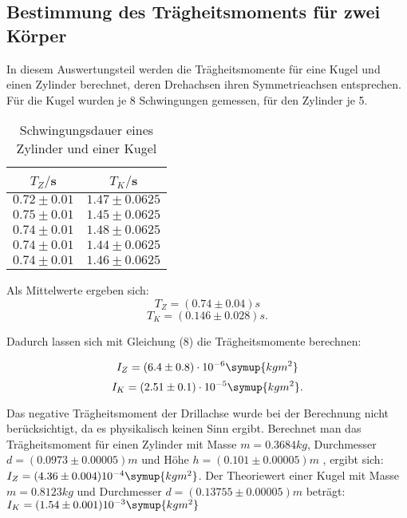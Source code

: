 \subsection{Bestimmung des Trägheitsmoments für zwei Körper}
In diesem Auswertungsteil werden die Trägheitsmomente für eine Kugel und einen 
Zylinder berechnet, deren Drehachsen ihren Symmetrieachsen entsprechen.
Für die Kugel wurden je 8 Schwingungen gemessen, für den Zylinder je 5.
\begin{table}[H]
  \centering
  \caption{Schwingungsdauer eines Zylinder und einer Kugel}
  \label{tab:Schwingungsdauer von Zylinder und Kugel}
  \begin{tabular}{c c}
    \toprule
    $T_Z/$s & $T_K/$s \\
    \midrule
    $0.72 \pm 0.01$ & $1.47\pm 0.0625$ \\
    $0.75 \pm 0.01$ & $1.45\pm 0.0625$ \\
    $0.74 \pm 0.01$ & $1.48\pm 0.0625$ \\
    $0.74 \pm 0.01$ & $1.44\pm 0.0625$ \\
    $0.74 \pm 0.01$ & $1.46\pm 0.0625$ \\
  
    \bottomrule
  \end{tabular}
\end{table}

Als Mittelwerte ergeben sich:
\begin{equation}
T_Z = (0.74 \pm 0.04) s
\end{equation}
\begin{equation}
T_K = (0.146 \pm 0.028) s.
\end{equation}



Dadurch lassen sich mit Gleichung (8) die Trägheitsmomente berechnen:

\begin{equation}
I_Z = (6.4 \pm 0.8)\cdot 10^{-6} \symup{kgm^2}
\end{equation}
\begin{equation}
I_K = (2.51 \pm 0.1)\cdot 10^{-5} \symup{kgm^2} .
\end{equation}

Das negative Trägheitsmoment der Drillachse wurde bei der Berechnung nicht berücksichtigt,
da es physikalisch keinen Sinn ergibt. 
Berechnet man das Trägheitsmoment für einen Zylinder mit Masse $m = 0.3684 kg$, Durchmesser $d = (0.0973 \pm 0.00005) m$
und Höhe $h = (0.101 \pm 0.00005) m$ , ergibt sich: $I_Z =(4.36 \pm 0.004)10^{-4} \symup{kgm^2}$.
Der Theoriewert einer Kugel mit Masse $ m = 0.8123 kg$ und Durchmesser $ d = (0.13755 \pm 0.00005) m$
beträgt: $I_K = (1.54 \pm 0.001)10^{-3} \symup{kgm^2}$





